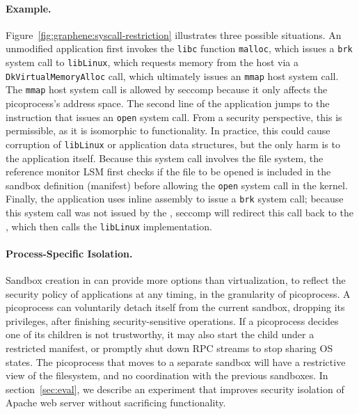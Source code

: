 \paragraph{Example.}
Figure~\ref{fig:graphene:syscall-restriction} illustrates three possible situations. 
An unmodified application first invokes the {\tt libc} function {\tt malloc}, which issues 
a {\tt brk} system call to {\tt libLinux}, which requests memory 
from the host via a {\tt Dk\-Virtual\-Memory\-Alloc} \pal{} call,
which ultimately issues an {\tt mmap} host system call.
The {\tt mmap} host system call is allowed by seccomp because it only 
affects the picoprocess's address space.
The second line of the application jumps to the \pal{} instruction that issues
an {\tt open} system call.
From a security perspective, this is permissible,
as it is isomorphic to \pal{} functionality.
In practice, this could cause
corruption of {\tt libLinux} or application data structures,
but the only harm is to the application itself. 
Because this system call involves the file system, the reference monitor LSM first checks if the file to be opened is included in the sandbox definition (manifest) before allowing  the {\tt open} system call in the kernel.  
Finally, the application uses inline assembly to issue a {\tt brk} system call;
because this system call was not issued by the \pal{},
seccomp will redirect this call back to the \pal{},
which then calls the {\tt libLinux} implementation.

\paragraph{Process-Specific Isolation.} 
Sandbox creation in \sysname{} can provide
more options than virtualization, to reflect the security policy of applications at any timing,
in the granularity of picoprocess. 
A picoprocess can voluntarily detach itself from the current sandbox, dropping its privileges,
after finishing security-sensitive operations.
If a picoprocess decides one of its children is not trustworthy, it may also start the child under a restricted manifest,
or promptly shut down RPC streams to stop sharing OS states.
The picoprocess that moves to a separate sandbox will have a restrictive view of the filesystem, and no coordination with the previous sandboxes.
In section~\ref{sec:eval}, we describe an experiment that improves security isolation of Apache web server without sacrificing functionality.

